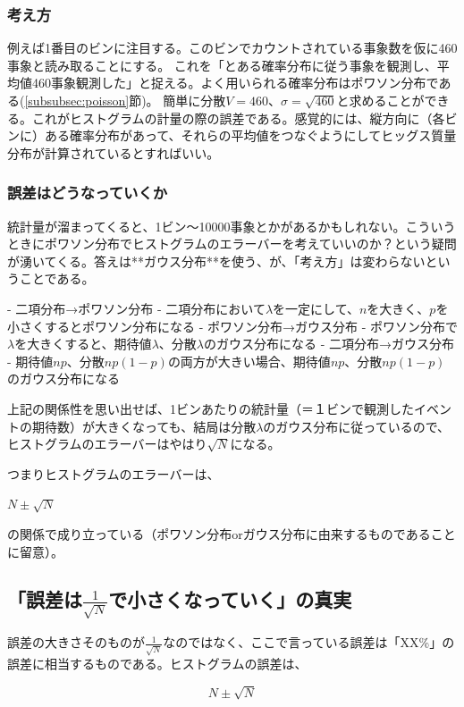 \documentclass[uplatex]{jreport}
\begin{document}
\subsubsection{考え方}
例えば1番目のビンに注目する。このビンでカウントされている事象数を仮に460事象と読み取ることにする。
これを「とある確率分布に従う事象を観測し、平均値460事象観測した」と捉える。よく用いられる確率分布はポワソン分布である(\ref{subsubsec:poisson}節)。
簡単に分散$V=460$、$\sigma=\sqrt{460}$と求めることができる。これがヒストグラムの計量の際の誤差である。感覚的には、縦方向に（各ビンに）ある確率分布があって、それらの平均値をつなぐようにしてヒッグス質量分布が計算されているとすればいい。

\subsubsection{誤差はどうなっていくか}
統計量が溜まってくると、1ビン〜10000事象とかがあるかもしれない。こういうときにポワソン分布でヒストグラムのエラーバーを考えていいのか？という疑問が湧いてくる。答えは**ガウス分布**を使う、が、「考え方」は変わらないということである。

- 二項分布→ポワソン分布
- 二項分布において$\lambda$を一定にして、$n$を大きく、$p$を小さくするとポワソン分布になる
- ポワソン分布→ガウス分布
- ポワソン分布で$\lambda$を大きくすると、期待値$\lambda$、分散$\lambda$のガウス分布になる
- 二項分布→ガウス分布
- 期待値$np$、分散$np(1-p)$の両方が大きい場合、期待値$np$、$分散np(1-p)$のガウス分布になる

上記の関係性を思い出せば、1ビンあたりの統計量（＝１ビンで観測したイベントの期待数）が大きくなっても、結局は分散$\lambda$のガウス分布に従っているので、ヒストグラムのエラーバーはやはり$\sqrt{N}$になる。

つまりヒストグラムのエラーバーは、

$N\pm\sqrt{N}$

の関係で成り立っている（ポワソン分布orガウス分布に由来するものであることに留意）。


\subsection{「誤差は$\frac{1}{\sqrt{N}}$で小さくなっていく」の真実}
誤差の大きさそのものが$\frac{1}{\sqrt{N}}$なのではなく、ここで言っている誤差は「XX\%」の誤差に相当するものである。ヒストグラムの誤差は、

\begin{equation}
  N\pm\sqrt{N}
\end{equation}
\end{document}
